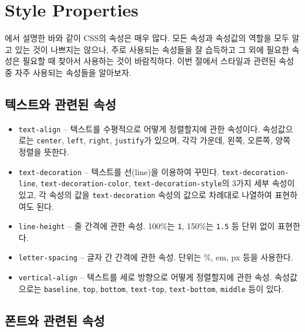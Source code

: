 \section{Style Properties} \label{sect:style-properties}

에서 설명한 바와 같이 CSS의 속성은 매우 많다. 모든 속성과 속성값의 역할을 모두 알고 있는 것이 나쁘지는 않으나, 주로 사용되는 속성들을 잘 습득하고 그 외에 필요한 속성은 필요할 때 찾아서 사용하는 것이 바람직하다. 이번 절에서 스타일과 관련된 속성 중 자주 사용되는 속성들을 알아보자.

\subsection*{텍스트와 관련된 속성}

\begin{itemize}
    \item \texttt{text-align} – 텍스트를 수평적으로 어떻게 정렬할지에 관한 속성이다. 속성값으로는 \texttt{center}, \texttt{left}, \texttt{right}, \texttt{justify}가 있으며, 각각 가운데, 왼쪽, 오른쪽, 양쪽 정렬을 뜻한다.
    \item \texttt{text-decoration} – 텍스트를 선(line)을 이용하여 꾸민다. \texttt{text-decoration-line}, \texttt{text-decoration-color}, \texttt{text-decoration-style}의 3가지 세부 속성이 있고, 각 속성의 값을 \texttt{text-decoration} 속성의 값으로 차례대로 나열하여 표현하여도 된다.	
    \item \texttt{line-height} – 줄 간격에 관한 속성. 100\%는 \texttt{1}, 150\%는 \texttt{1.5} 등 단위 없이 표현한다.
    \item \texttt{letter-spacing} – 글자 간 간격에 관한 속성. 단위는 \%, em, px 등을 사용한다.
    \item \texttt{vertical-align} – 텍스트를 세로 방향으로 어떻게 정렬할지에 관한 속성. 속성값으로는 \texttt{baseline}, \texttt{top}, \texttt{bottom}, \texttt{text-top}, \texttt{text-bottom}, \texttt{middle} 등이 있다.
\end{itemize}

\subsection*{폰트와 관련된 속성}

